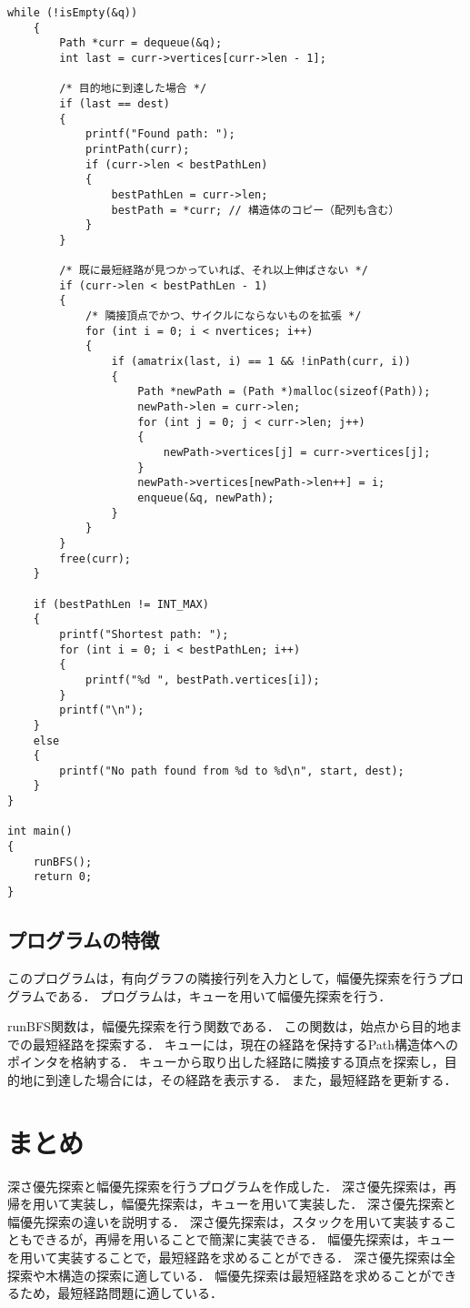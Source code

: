 \documentclass{ltjsarticle}
\begin{document}
\begin{lstlisting}[frame=single, lineskip=-5pt]
    while (!isEmpty(&q))
    {
        Path *curr = dequeue(&q);
        int last = curr->vertices[curr->len - 1];

        /* 目的地に到達した場合 */
        if (last == dest)
        {
            printf("Found path: ");
            printPath(curr);
            if (curr->len < bestPathLen)
            {
                bestPathLen = curr->len;
                bestPath = *curr; // 構造体のコピー（配列も含む）
            }
        }

        /* 既に最短経路が見つかっていれば、それ以上伸ばさない */
        if (curr->len < bestPathLen - 1)
        {
            /* 隣接頂点でかつ、サイクルにならないものを拡張 */
            for (int i = 0; i < nvertices; i++)
            {
                if (amatrix(last, i) == 1 && !inPath(curr, i))
                {
                    Path *newPath = (Path *)malloc(sizeof(Path));
                    newPath->len = curr->len;
                    for (int j = 0; j < curr->len; j++)
                    {
                        newPath->vertices[j] = curr->vertices[j];
                    }
                    newPath->vertices[newPath->len++] = i;
                    enqueue(&q, newPath);
                }
            }
        }
        free(curr);
    }

    if (bestPathLen != INT_MAX)
    {
        printf("Shortest path: ");
        for (int i = 0; i < bestPathLen; i++)
        {
            printf("%d ", bestPath.vertices[i]);
        }
        printf("\n");
    }
    else
    {
        printf("No path found from %d to %d\n", start, dest);
    }
}

int main()
{
    runBFS();
    return 0;
}
\end{lstlisting}

\subsection{プログラムの特徴}
このプログラムは，有向グラフの隣接行列を入力として，幅優先探索を行うプログラムである．
プログラムは，キューを用いて幅優先探索を行う．

runBFS関数は，幅優先探索を行う関数である．
この関数は，始点から目的地までの最短経路を探索する．
キューには，現在の経路を保持するPath構造体へのポインタを格納する．
キューから取り出した経路に隣接する頂点を探索し，目的地に到達した場合には，その経路を表示する．
また，最短経路を更新する．

\section{まとめ}
深さ優先探索と幅優先探索を行うプログラムを作成した．
深さ優先探索は，再帰を用いて実装し，幅優先探索は，キューを用いて実装した．
深さ優先探索と幅優先探索の違いを説明する．
深さ優先探索は，スタックを用いて実装することもできるが，再帰を用いることで簡潔に実装できる．
幅優先探索は，キューを用いて実装することで，最短経路を求めることができる．
深さ優先探索は全探索や木構造の探索に適している．
幅優先探索は最短経路を求めることができるため，最短経路問題に適している．
\end{document}
